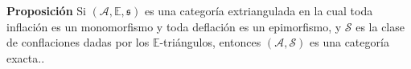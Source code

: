 \documentclass[preview]{standalone}
\begin{document}
\begin{center}
\justifying \textbf{Proposición} Si $(\mathscr{A}, \mathbb{E}, \mathfrak{s})$ es una categoría extriangulada en la cual toda inflación es un monomorfismo y toda deflación es un epimorfismo, y $\mathscr{S}$ es la clase de conflaciones dadas por los $\mathbb{E}$-triángulos, entonces $(\mathscr{A}, \mathscr{S})$ es una categoría exacta..
\end{center}
\end{document}
